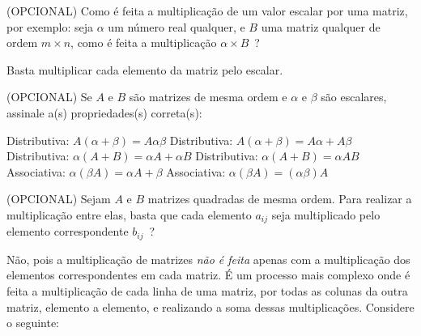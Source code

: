 \documentclass[pdftex, brazil, 12pt, oneside, addpoints]{exam}
\newcommand{\vf}[1][{}]{%
  \fillin[#1][0.25in]%
}
\begin{document}
\begin{questions}

\question
(OPCIONAL) Como é feita a multiplicação de um valor escalar por uma matriz, por exemplo: seja $\alpha$ um
número real qualquer, e $B$ uma matriz qualquer de ordem $m \times n$, como é feita a multiplicação $\alpha \times B$\ ?
\begin{solution}
  Basta multiplicar cada elemento da matriz pelo escalar.
\end{solution}

\question
(OPCIONAL) Se $A$ e $B$ são matrizes de mesma ordem e $\alpha$ e $\beta$ são escalares, assinale
a(s) propriedades(s) correta(s):
\begin{checkboxes}
  \choice Distributiva: $A(\alpha + \beta) = A \alpha \beta$
  \CorrectChoice Distributiva: $A(\alpha + \beta) = A \alpha + A \beta$
  \CorrectChoice Distributiva: $\alpha (A + B) = \alpha A + \alpha B$
  \choice Distributiva: $\alpha (A + B) = \alpha AB$
  \choice Associativa: $\alpha(\beta A) = \alpha A + \beta$
  \CorrectChoice Associativa: $\alpha(\beta A) = (\alpha \beta)A$
\end{checkboxes}

\question
(OPCIONAL) Sejam $A$ e $B$ matrizes quadradas de mesma ordem. Para realizar a multiplicação entre elas,
basta que cada elemento $a_{ij}$ seja multiplicado pelo elemento correspondente $b_{ij}$\ ?
\begin{solution}
  Não, pois a multiplicação de matrizes \emph{não é feita} apenas com a multiplicação
  dos elementos correspondentes em cada matriz. É um processo mais complexo onde é feita a
  multiplicação de cada linha de uma matriz, por todas as colunas da outra matriz, elemento a
  elemento, e realizando a soma dessas multiplicações. Considere o seguinte:


\end{solution}
\end{questions}
\end{document}
